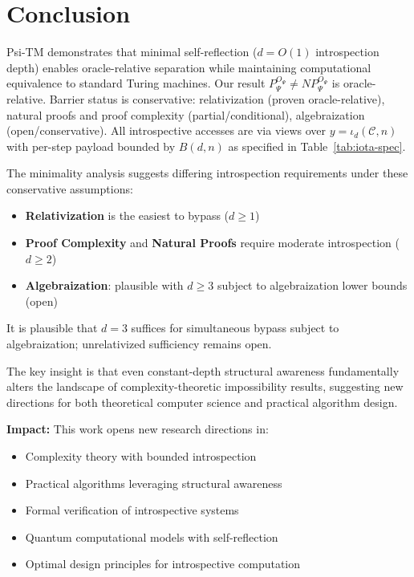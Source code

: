 \documentclass[11pt]{article}
\theoremstyle{plain}
\theoremstyle{definition}
\def\B(#1,#2){B(#1,#2)}
\begin{document}
\section{Conclusion}

Psi-TM demonstrates that minimal self-reflection ($d = O(1)$ introspection depth) enables oracle-relative separation while maintaining computational equivalence to standard Turing machines. Our result $P^{O_\Psi}_\Psi \neq NP^{O_\Psi}_\Psi$ is oracle-relative. Barrier status is conservative: relativization (proven oracle-relative), natural proofs and proof complexity (partial/conditional), algebraization (open/conservative). All introspective accesses are via views over $y=\iota_d(\mathcal{C},n)$ with per-step payload bounded by $\B(d,n)$ as specified in Table~\ref{tab:iota-spec}.

The minimality analysis suggests differing introspection requirements under these conservative assumptions:
\begin{itemize}
\item \textbf{Relativization} is the easiest to bypass ($d \geq 1$)
\item \textbf{Proof Complexity} and \textbf{Natural Proofs} require moderate introspection ($d \geq 2$)
\item \textbf{Algebraization}: plausible with $d \geq 3$ subject to algebraization lower bounds (open)
\end{itemize}

It is plausible that $d=3$ suffices for simultaneous bypass subject to algebraization; unrelativized sufficiency remains open.

The key insight is that even constant-depth structural awareness fundamentally alters the landscape of complexity-theoretic impossibility results, suggesting new directions for both theoretical computer science and practical algorithm design.

\textbf{Impact:} This work opens new research directions in:
\begin{itemize}
\item Complexity theory with bounded introspection
\item Practical algorithms leveraging structural awareness
\item Formal verification of introspective systems
\item Quantum computational models with self-reflection
\item Optimal design principles for introspective computation
\end{itemize}

\nocite{*}


\end{document}

